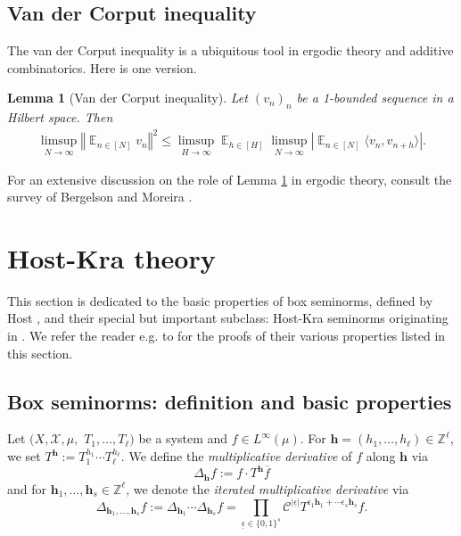 \documentclass[11pt]{amsart}
\newtheorem{lemma}{Lemma}[section]
\theoremstyle{definition}
\DeclareMathOperator*{\E}{\mathbb{E}}
\newcommand{\Z}{{\mathbb Z}}
\newcommand{\CC}{{\mathcal C}}
\newcommand{\CX}{{\mathcal X}}
\newcommand{\bh}{{\mathbf{h}}}
\newcommand{\eps}{\epsilon}
\newcommand{\ueps}{{\underline{\epsilon}}}
\renewcommand{\angle}[1]{\mathopen{}\left\langle #1\mathclose{}\right\rangle}
\newcommand{\norm}[1]{\left\Vert #1\right\Vert}
\newcommand{\1}{{\mathbf{1}}}
\newcommand{\abs}[1]{\mathopen{}\left| #1\mathclose{}\right|}
\begin{document}
\subsection{Van der Corput inequality}

The van der Corput inequality is a ubiquitous tool in ergodic theory and additive combinatorics. Here is one version.
\begin{lemma}[Van der Corput inequality]\label{L: vdC} 
    Let $(v_n)_n$ be a 1-bounded sequence in a Hilbert space. Then
    \begin{align*}
        \limsup_{N\to\infty}\norm{\E_{n\in[N]}v_n}^2 \leq \limsup_{H\to\infty}\E_{h\in[H]}\limsup_{N\to\infty}\abs{\E_{n\in[N]}\langle v_n, v_{n+h}\rangle}. 
    \end{align*}
\end{lemma}
For an extensive discussion on the role of Lemma \ref{L: vdC} in ergodic theory, consult the survey of Bergelson and Moreira \cite{BM16}.

\section{Host-Kra theory}\label{A: Host-Kra theory}
This section is dedicated to the basic properties of box seminorms, defined by Host \cite{H09}, and their special but important subclass: Host-Kra seminorms originating in \cite{HK05a}. We refer the reader e.g. to \cite{DKS22, FrKu22b, HK05a, HK18, TZ16} for the proofs of their various properties listed in this section.

\subsection{Box seminorms: definition and basic properties}\label{AA: box seminorms}
Let $(X, \CX, \mu,$\! $T_1, \ldots, T_\ell)$ be a system and $f\in L^{\infty}(\mu)$. For $\bh = (h_1, \ldots, h_\ell)\in\Z^\ell$, we set $T^\bh:=T_1^{h_1}\cdots T_\ell^{h_\ell}$.
We define the \emph{multiplicative derivative} of $f$ along $\bh$ via
 $$
 \Delta_{\bh} f :=  f \cdot T^\bh \overline{f} 
 $$
   and for $\bh_1, \ldots, \bh_s\in\Z^\ell$, we denote the \emph{iterated multiplicative derivative} via
$$
\Delta_{\bh_1, \ldots, \bh_s} f  := \Delta_{\bh_1}\cdots\Delta_{\bh_s} f = \prod_{\ueps\in\{0,1\}^s} \CC^{|\ueps|} T^{\eps_1 \bh_1 + \cdots \eps_s\bh_s }f.
$$
\end{document}
